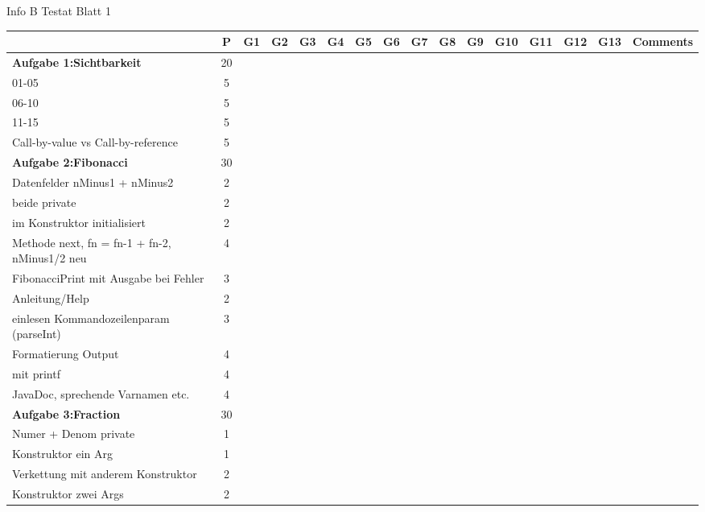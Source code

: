 \documentclass[a4paper, 10pt, landscape]{scrartcl}
\begin{document}
\ttfamily \huge{Info B} Testat Blatt 1
      \small 
\begin{longtable}{|p{6cm}|c|c|c|c|c|c|c|c|c|c|c|c|c|c|p{8cm}|}\hline
& \textbf{P} & \textbf{G1} & \textbf{G2} & \textbf{G3} & \textbf{G4} & \textbf{G5} & \textbf{G6} & \textbf{G7} & \textbf{G8} & \textbf{G9} & \textbf{G10} & \textbf{G11} & \textbf{G12} & \textbf{G13}& Comments \\ \hline\hline
\rowcolor{gray!50}\textbf{Aufgabe 1:Sichtbarkeit} & 20& & & & & & & & & & & & & & \\\hline\hline
01-05& 5& & & & & & & & & & & & & & \\ \hline
06-10& 5& & & & & & & & & & & & & & \\ \hline
11-15& 5& & & & & & & & & & & & & & \\ \hline
Call-by-value vs Call-by-reference& 5& & & & & & & & & & & & & & \\ \hline
\rowcolor{gray!50}\textbf{Aufgabe 2:Fibonacci} & 30& & & & & & & & & & & & & & \\\hline\hline
Datenfelder nMinus1 + nMinus2& 2& & & & & & & & & & & & & & \\ \hline
beide private& 2& & & & & & & & & & & & & & \\ \hline
im Konstruktor initialisiert& 2& & & & & & & & & & & & & & \\ \hline
Methode next, fn = fn-1 + fn-2, nMinus1/2 neu& 4& & & & & & & & & & & & & & \\ \hline
FibonacciPrint mit Ausgabe bei Fehler& 3& & & & & & & & & & & & & & \\ \hline
Anleitung/Help& 2& & & & & & & & & & & & & & \\ \hline
einlesen Kommandozeilenparam (parseInt)& 3& & & & & & & & & & & & & & \\ \hline
Formatierung Output& 4& & & & & & & & & & & & & & \\ \hline
mit printf& 4& & & & & & & & & & & & & & \\ \hline
JavaDoc, sprechende Varnamen etc.& 4& & & & & & & & & & & & & & \\ \hline
\rowcolor{gray!50}\textbf{Aufgabe 3:Fraction} & 30& & & & & & & & & & & & & & \\\hline\hline
Numer + Denom private& 1& & & & & & & & & & & & & & \\ \hline
Konstruktor ein Arg& 1& & & & & & & & & & & & & & \\ \hline
Verkettung mit anderem Konstruktor& 2& & & & & & & & & & & & & & \\ \hline
Konstruktor zwei Args& 2& & & & & & & & & & & & & & \\ \hline

\end{longtable}
\end{document}

